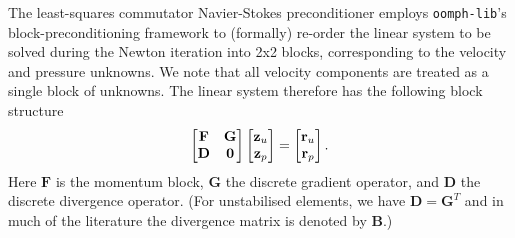 The least-squares commutator Navier-Stokes preconditioner employs
\texttt{oomph-\allowbreak lib}'s block-preconditioning framework to (formally)
re-order the linear system to be solved during the Newton iteration into 2x2
blocks, corresponding to the velocity and pressure unknowns. We note that all
velocity components are treated as a single block of unknowns. The linear
system therefore has the following block structure
\begin{equation*}
\begin{bmatrix}
{\bf F} & {\bf G} \\ {\bf D} & {\bf 0} 
\end{bmatrix}
\begin{bmatrix}
{\bf z}_u \\ {\bf z}_p
\end{bmatrix} 
 =
\begin{bmatrix}
{\bf r}_u \\ {\bf r}_p
\end{bmatrix} 
.
\end{equation*}
Here $\mathbf{F}$ is the momentum block, $\mathbf{G}$ the discrete gradient
operator, and $\mathbf{D}$ the discrete divergence operator. (For unstabilised
elements, we have $\mathbf{D} = \mathbf{G}^T$ and in much of the literature the
divergence matrix is denoted by $\mathbf{B}$.)

